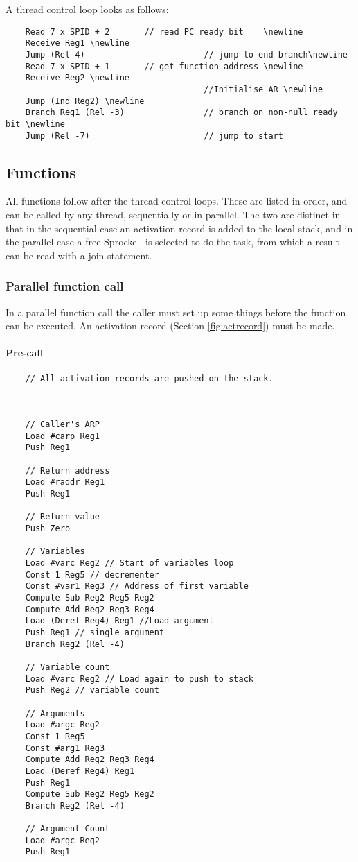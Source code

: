 \documentclass[10pt,a4paper]{report}
\begin{document}
A thread control loop looks as follows:
\begin{verbatim}
	Read 7 x SPID + 2		// read PC ready bit 	\newline
	Receive Reg1 \newline
	Jump (Rel 4)						// jump to end branch\newline
	Read 7 x SPID + 1		// get function address \newline
	Receive Reg2 \newline
										//Initialise AR \newline
	Jump (Ind Reg2) \newline
	Branch Reg1 (Rel -3)				// branch on non-null ready bit \newline
	Jump (Rel -7)						// jump to start
\end{verbatim}

\subsection{Functions}
All functions follow after the thread control loops. These are listed in order, and can be called by any thread, sequentially or in parallel. The two are distinct in that in the sequential case an activation record is added to the local stack, and in the parallel case a free Sprockell is selected to do the task, from which a result can be read with a join statement.

\subsubsection{Parallel function call}
In a parallel function call the caller must set up some things before the function can be executed. An activation record (Section \ref{fig:actrecord}) must be made. 

\paragraph{Pre-call}
\begin{verbatim}
	// All activation records are pushed on the stack.
		
	 
	
	// Caller's ARP
	Load #carp Reg1
	Push Reg1 
	
	// Return address
	Load #raddr Reg1	
	Push Reg1
	
	// Return value
	Push Zero
	
	// Variables
	Load #varc Reg2 // Start of variables loop
	Const 1 Reg5 // decrementer
	Const #var1 Reg3 // Address of first variable
	Compute Sub Reg2 Reg5 Reg2
	Compute Add Reg2 Reg3 Reg4
	Load (Deref Reg4) Reg1 //Load argument
	Push Reg1 // single argument
	Branch Reg2 (Rel -4)
	
	// Variable count
	Load #varc Reg2 // Load again to push to stack
	Push Reg2 // variable count
	
	// Arguments
	Load #argc Reg2
	Const 1 Reg5
	Const #arg1 Reg3
	Compute Add Reg2 Reg3 Reg4
	Load (Deref Reg4) Reg1
	Push Reg1
	Compute Sub Reg2 Reg5 Reg2 
	Branch Reg2 (Rel -4)
	
	// Argument Count
	Load #argc Reg2
	Push Reg1
	
\end{verbatim}
\end{document}
